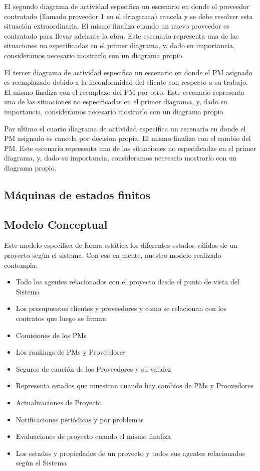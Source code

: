 El segundo diagrama de actividad especifica un escenario en donde el proveedor contratado (llamado proveedor 1 en el driagrama) cancela y se debe resolver esta situación extraordinaria. El mismo finaliza cuando un nuevo proveedor es contratado para llevar adelante la obra. Este escenario representa una de las situaciones no especificadas en el primer diagrama, y, dado su importancia, consideramos necesario mostrarlo con un diagrama propio.

El tercer diagrama de actividad especifica un escenario en donde el PM asignado es reemplazado debido a la inconformidad del cliente con respecto a su trabajo. El mismo finaliza con el reemplazo del PM por otro. Este escenario representa una de las situaciones no especificadas en el primer diagrama, y, dado su importancia, consideramos necesario mostrarlo con un diagrama propio.

Por ultimo el cuarto diagrama de actividad especifica un escenario en donde el PM asignado es cancela por decision propia. El mismo finaliza con el cambio del PM. Este escenario representa una de las situaciones no especificadas en el primer diagrama, y, dado su importancia, consideramos necesario mostrarlo con un diagrama propio.

\subsection{Máquinas de estados finitos}

\subsection{Modelo Conceptual}

Este modelo especifica de forma estática los diferentes estados válidos de un proyecto según el sistema. Con eso en mente, nuestro modelo realizado contempla:

\begin{itemize}
	\item Todo los agentes relacionados con el proyecto desde el punto de vista del Sistema
	\item Los presupuestos clientes y proveedores y como se relacionan con los contratos que luego se firman
	\item Comisiones de los PMs
	\item Los rankings de PMs y Proveedores
	\item Seguros de caución de los Proveedores y su validez
	\item Representa estados que muestran cuando hay cambios de PMs y Proovedores
	\item Actualizaciones de Proyecto
	\item Notificaciones periódicas y por problemas
	\item Evaluaciones de proyecto cuando el mismo finaliza
	\item Los estados y propiedades de un proyecto y todos sus agentes relacionados según el Sistema
\end{itemize}

